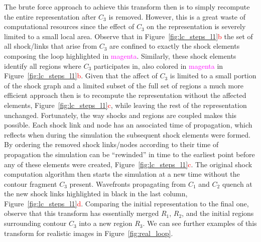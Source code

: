 The brute force approach to achieve this transform then is to simply recompute the entire representation after $C_3$ is removed. However, this is a great waste of computational resources since the effect of $C_3$ on the representation is severely limited to a small local area. Observe that in Figure~\ref{fig:lc_steps_l1}\textcolor{red}{b} the set of all shock/links that arise from $C_3$ are confined to exactly the shock elements composing the loop highlighted in \textcolor{magenta}{magenta}. Similarly, these shock elements identify all regions where $C_3$ participates in, also colored in \textcolor{magenta}{magenta} in Figure~\ref{fig:lc_steps_l1}\textcolor{red}{b}. Given that the affect of $C_3$ is limited to a small portion of the shock graph and a limited subset of the full set of regions a much more efficient approach then is to recompute the representation without the affected elements, Figure~\ref{fig:lc_steps_l1}\textcolor{red}{c}, while leaving the rest of the representation unchanged. Fortunately, the way shocks and regions are coupled makes this possible. Each shock link and node has an associated time of propagation, which reflects when during the simulation the subsequent shock elements were formed. By ordering the removed shock links/nodes according to their time of propagation the simulation can be ``rewinded'' in time to the earliest point before any of these elements were created, Figure~\ref{fig:lc_steps_l1}\textcolor{red}{c}. The original shock computation algorithm then starts the simulation at a new time without the contour fragment $C_3$ present. Wavefronts propagating from $C_1$ and $C_2$ quench at the new shock links highlighted in black in the last column, Figure~\ref{fig:lc_steps_l1}\textcolor{red}{d}. Comparing the initial representation to the final one, observe that this transform has essentially merged $R_1$, $R_2$, and the initial regions surrounding contour $C_3$ into a new region $R_3$. We can see further examples of this transform for realistic images in Figure~\ref{fig:real_loop}.

